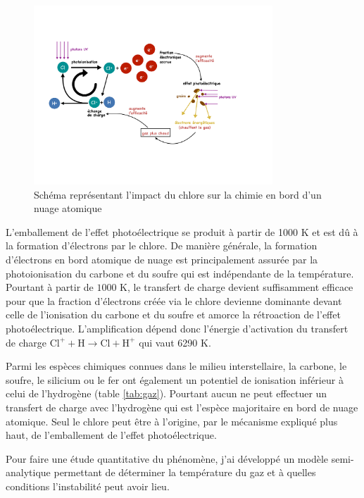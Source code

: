 \begin{figure}[!h]
   \centering
        \includegraphics[trim = {2cm 5cm 4cm 4cm},clip, width=0.8\textwidth]{figure/Cl/Cl_heating_fr-5.pdf}
    \caption{Schéma représentant l'impact du chlore sur la chimie en bord d'un nuage atomique}
    \label{fig:catalyseur}
\end{figure}{}

L'emballement de l'effet photoélectrique se produit à partir de 1000 K et est dû à la formation d'électrons par le chlore. De manière générale, la formation d'électrons en bord atomique de nuage est principalement assurée par la photoionisation du carbone et du soufre qui est indépendante de la température. Pourtant à partir de $1000$ K, le transfert de charge devient suffisamment efficace pour que la fraction d'électrons créée via le chlore devienne dominante devant celle de l'ionisation du carbone et du soufre et amorce la rétroaction de l'effet photoélectrique. L'amplification dépend donc l'énergie d'activation du transfert de charge $\mathrm{Cl}^+  + \mathrm{H}    \rightarrow \mathrm{Cl}   +  \mathrm{H}^+$ qui vaut 6290 K.\newline

Parmi les espèces chimiques connues dans le milieu interstellaire, la carbone, le soufre, le silicium ou le fer ont également un potentiel de ionisation inférieur à celui de l'hydrogène (table \ref{tab:gaz}). Pourtant aucun ne peut effectuer un transfert de charge avec l'hydrogène qui est l'espèce majoritaire en bord de nuage atomique. Seul le chlore peut être à l'origine, par le mécanisme expliqué plus haut, de l'emballement de l'effet photoélectrique. \newline 

 Pour faire une étude quantitative du phénomène, j'ai développé un modèle semi-analytique permettant de déterminer la température du gaz et à quelles conditions l'instabilité peut avoir lieu. 


